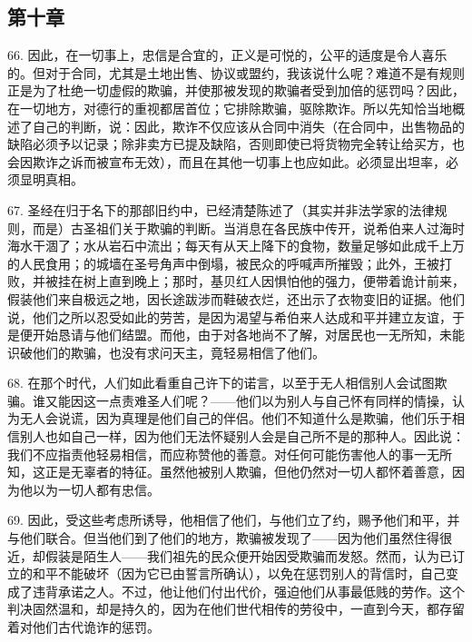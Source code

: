 \subsection{第十章}

\par

66. 因此，在一切事上，忠信是合宜的，正义是可悦的，公平的适度是令人喜乐的。但对于合同，尤其是土地出售、协议或盟约，我该说什么呢？难道不是有规则正是为了杜绝一切虚假的欺骗，并使那被发现的欺骗者受到加倍的惩罚吗？因此，在一切地方，对德行的重视都居首位；它排除欺骗，驱除欺诈。所以先知恰当地概述了自己的判断，说：因此，欺诈不仅应该从合同中消失（在合同中，出售物品的缺陷必须予以记录；除非卖方已提及缺陷，否则即使已将货物完全转让给买方，也会因欺诈之诉而被宣布无效），而且在其他一切事上也应如此。必须显出坦率，必须显明真相。\par

67. 圣经在归于名下的那部旧约中，已经清楚陈述了（其实并非法学家的法律规则，而是）古圣祖们关于欺骗的判断。当消息在各民族中传开，说希伯来人过海时海水干涸了；水从岩石中流出；每天有从天上降下的食物，数量足够如此成千上万的人民食用；的城墙在圣号角声中倒塌，被民众的呼喊声所摧毁；此外，王被打败，并被挂在树上直到晚上；那时，基贝红人因惧怕他的强力，便带着诡计前来，假装他们来自极远之地，因长途跋涉而鞋破衣烂，还出示了衣物变旧的证据。他们说，他们之所以忍受如此的劳苦，是因为渴望与希伯来人达成和平并建立友谊，于是便开始恳请与他们结盟。而他，由于对各地尚不了解，对居民也一无所知，未能识破他们的欺骗，也没有求问天主，竟轻易相信了他们。\par

68. 在那个时代，人们如此看重自己许下的诺言，以至于无人相信别人会试图欺骗。谁又能因这一点责难圣人们呢？——他们以为别人与自己怀有同样的情操，认为无人会说谎，因为真理是他们自己的伴侣。他们不知道什么是欺骗，他们乐于相信别人也如自己一样，因为他们无法怀疑别人会是自己所不是的那种人。因此说：我们不应指责他轻易相信，而应称赞他的善意。对任何可能伤害他人的事一无所知，这正是无辜者的特征。虽然他被别人欺骗，但他仍然对一切人都怀着善意，因为他以为一切人都有忠信。\par

69. 因此，受这些考虑所诱导，他相信了他们，与他们立了约，赐予他们和平，并与他们联合。但当他们到了他们的地方，欺骗被发现了——因为他们虽然住得很近，却假装是陌生人——我们祖先的民众便开始因受欺骗而发怒。然而，认为已订立的和平不能破坏（因为它已由誓言所确认），以免在惩罚别人的背信时，自己变成了违背承诺之人。不过，他让他们付出代价，强迫他们从事最低贱的劳作。这个判决固然温和，却是持久的，因为在他们世代相传的劳役中，一直到今天，都存留着对他们古代诡诈的惩罚。\par

